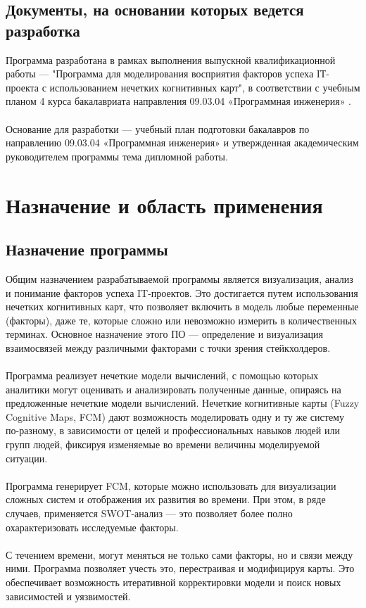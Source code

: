 \documentclass{article}
\begin{document}
    \subsection {Документы, на основании которых ведется разработка}
    Программа разработана в рамках выполнения выпускной квалификационной работы — "{}Программа для моделирования восприятия факторов успеха IТ-проекта с использованием нечетких когнитивных карт"{}, в соответствии с учебным планом 4 курса бакалавриата направления 09.03.04 «Программная инженерия» \cite{litlink10}.\\
    ~\\
    Основание для разработки — учебный план подготовки бакалавров по направлению 09.03.04 «Программная инженерия» \cite{litlink11} и утвержденная академическим руководителем программы тема дипломной работы.
    \newpage
    \section {Назначение и область применения}
    \subsection {Назначение программы}
    Общим назначением разрабатываемой программы является визуализация, анализ и понимание факторов успеха IT-проектов. Это достигается путем использования нечетких когнитивных карт, что позволяет включить в модель любые переменные (факторы), даже те, которые сложно или невозможно измерить в количественных терминах. Основное назначение этого ПО — определение и визуализация взаимосвязей между различными факторами с точки зрения стейкхолдеров.\\
    ~\\
    Программа реализует нечеткие модели вычислений, с помощью которых аналитики могут оценивать и анализировать полученные данные, опираясь на предложенные нечеткие модели вычислений. Нечеткие когнитивные карты (Fuzzy Cognitive Maps, FCM) дают возможность моделировать одну и ту же систему по-разному, в зависимости от целей и профессиональных навыков людей или групп людей, фиксируя изменяемые во времени величины моделируемой ситуации.\\
    ~\\
    Программа генерирует FCM, которые можно использовать для визуализации сложных систем и отображения их развития во времени. При этом, в ряде случаев, применяется SWOT-анализ — это позволяет более полно охарактеризовать исследуемые факторы.\\
    ~\\
    С течением времени, могут меняться не только сами факторы, но и связи между ними. Программа позволяет учесть это, перестраивая и модифицируя карты. Это обеспечивает возможность итеративной корректировки модели и поиск новых зависимостей и уязвимостей.\\
\end{document}
